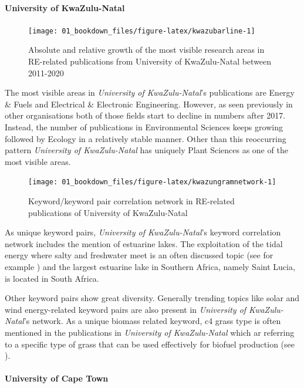 \documentclass[
]{book}
\begin{document}
\hypertarget{university-of-kwazulu-natal}{%
\paragraph{University of KwaZulu-Natal}\label{university-of-kwazulu-natal}}

\begin{figure}
\texttt{[image: 01\_bookdown\_files/figure-latex/kwazubarline-1]} \caption{Absolute and relative growth of the most visible research areas in RE-related publications from University of KwaZulu-Natal between 2011-2020}\label{fig:kwazubarline}
\end{figure}

The most visible areas in \emph{University of KwaZulu-Natal}'s publications are Energy \& Fuels and Electrical \& Electronic Engineering. However, as seen previously in other organisations both of those fields start to decline in numbers after 2017. Instead, the number of publications in Environmental Sciences keeps growing followed by Ecology in a relatively stable manner. Other than this reoccurring pattern \emph{University of KwaZulu-Natal} has uniquely Plant Sciences as one of the most visible areas.

\begin{figure}
\texttt{[image: 01\_bookdown\_files/figure-latex/kwazungramnetwork-1]} \caption{Keyword/keyword pair correlation network in RE-related publications of University of KwaZulu-Natal}\label{fig:kwazungramnetwork}
\end{figure}

As unique keyword pairs, \emph{University of KwaZulu-Natal}'s keyword correlation network includes the mention of estuarine lakes. The exploitation of the tidal energy where salty and freshwater meet is an often discussed topic (see for example \citet{ross2021}) and the largest estuarine lake in Southern Africa, namely Saint Lucia, is located in South Africa.

Other keyword pairs show great diversity. Generally trending topics like solar and wind energy-related keyword pairs are also present in \emph{University of KwaZulu-Natal}'s network. As a unique biomass related keyword, c4 grass type is often mentioned in the publications in \emph{University of KwaZulu-Natal} which ar referring to a specific type of grass that can be used effectively for biofuel production (see \citet{vanderweijde2013}).

\hypertarget{university-of-cape-town}{%
\paragraph{University of Cape Town}\label{university-of-cape-town}}
\end{document}
